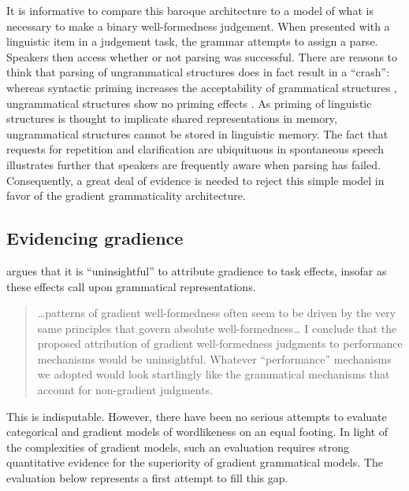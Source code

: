 It is informative to compare this baroque architecture to a model of what is necessary to make a binary well-formedness judgement. When presented with a linguistic item in a judgement task, the grammar attempts to assign a parse. Speakers then access whether or not parsing was successful. 
There are reasons to think that parsing of ungrammatical structures does in fact result in a ``crash'': whereas syntactic priming increases the acceptability of grammatical structures \citep{Luka2005}, ungrammatical structures show no priming effects \citep{Sprouse2007b}. 
As priming of linguistic structures is thought to implicate shared representations in memory, ungrammatical structures cannot be stored in linguistic memory. 
The fact that requests for repetition and clarification are ubiquituous in spontaneous speech illustrates further that speakers are frequently aware when parsing has failed.
Consequently, a great deal of evidence is needed to reject this simple model in favor of the gradient grammaticality architecture. 

\subsection{Evidencing gradience}

\citet{Hayes2000} argues that it is ``uninsightful'' to attribute gradience to task effects, insofar as these effects call upon grammatical representations. 


\begin{quote}
\ldots{}patterns of gradient well-formedness often seem to be driven by the very same principles that govern absolute well-formedness\ldots{} I conclude that the proposed attribution of gradient well-formedness judgments to performance mechanisms would be uninsightful. Whatever ``performance'' mechanisms we adopted would look startlingly like the grammatical mechanisms that account for non-gradient judgments. \citep[99]{Hayes2000}
\end{quote}

\noindent
This is indisputable. 
However, there have been no serious attempts to evaluate categorical and gradient models of wordlikeness on an equal footing.
In light of the complexities of gradient models, such an evaluation requires strong quantitative evidence for the superiority of gradient grammatical models.
The evaluation below represents a first attempt to fill this gap.


